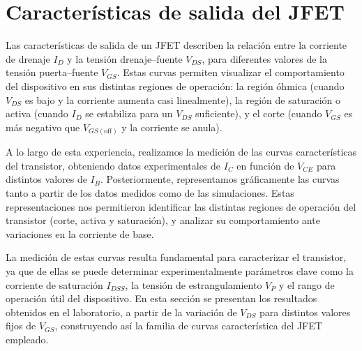 \chapter{Características de salida del JFET}
Las características de salida de un JFET describen la relación entre la corriente de drenaje $I_D$ y la tensión
drenaje–fuente $V_{DS}$, para diferentes valores de la tensión puerta–fuente $V_{GS}$. Estas curvas permiten visualizar
el comportamiento del dispositivo en sus distintas regiones de operación: la región óhmica (cuando $V_{DS}$ es bajo y la
corriente aumenta casi linealmente), la región de saturación o activa (cuando $I_D$ se estabiliza para un $V_{DS}$
suficiente), y el corte (cuando $V_{GS}$ es más negativo que $V_{GS(\text{off})}$ y la corriente se anula).

  A lo largo de esta experiencia, realizamos la medición de las curvas características del transistor, obteniendo datos
  experimentales de $I_C$ en función de $V_{CE}$ para distintos valores de $I_B$. Posteriormente, representamos
  gráficamente las curvas tanto a partir de los datos medidos como de las simulaciones. Estas representaciones nos
  permitieron identificar las distintas regiones de operación del transistor (corte, activa y saturación), y analizar su
  comportamiento ante variaciones en la corriente de base.

La medición de estas curvas resulta fundamental para caracterizar el transistor, ya que de ellas se puede determinar
experimentalmente parámetros clave como la corriente de saturación $I_{DSS}$, la tensión de estrangulamiento $V_P$ y el
rango de operación útil del dispositivo. En esta sección se presentan los resultados obtenidos en el laboratorio, a
partir de la variación de $V_{DS}$ para distintos valores fijos de $V_{GS}$, construyendo así la familia de curvas
característica del JFET empleado.

